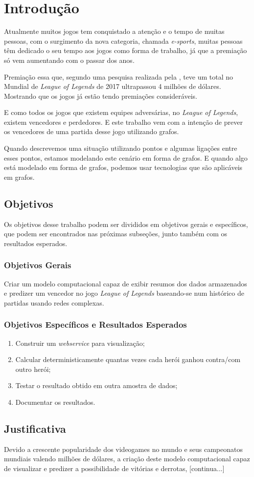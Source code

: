 \chapter{Introdução}
\label{chap:Introducao}

Atualmente muitos jogos tem conquistado a atenção e o tempo de muitas pessoas, com o surgimento da nova categoria, chamada \textit{e-sports}, muitas pessoas têm dedicado o seu tempo aos jogos como forma de trabalho, já que a premiação só vem aumentando com o passar dos anos.

Premiação essa que, segundo uma pesquisa realizada pela \citet{espn}, teve um total no Mundial de \textit{League of Legends} de 2017 ultrapassou 4 milhões de dólares. Mostrando que os jogos já estão tendo premiações consideráveis.

E como todos os jogos que existem equipes adversárias, no \textit{League of Legends}, existem vencedores e perdedores. E este trabalho vem com a intenção de prever os vencedores de uma partida desse jogo utilizando grafos.

Quando descrevemos uma situação utilizando pontos e algumas ligações entre esses pontos, estamos modelando este cenário em forma de grafos. E quando algo está modelado em forma de grafos, podemos usar tecnologias que são aplicáveis em grafos.

\section{Objetivos}
Os objetivos desse trabalho podem ser divididos em objetivos gerais e específicos, que podem ser encontrados nas próximas subseções, junto também com os resultados esperados.
\subsection{Objetivos Gerais}
Criar um modelo computacional capaz de exibir resumos dos dados armazenados  e predizer um vencedor no jogo \textit{League of Legends} baseando-se num histórico de partidas usando redes complexas.

\subsection{Objetivos Específicos e Resultados Esperados}

\begin{enumerate}
\item Construir um \textit{webservice} para visualização;
\item Calcular deterministicamente quantas vezes cada herói ganhou contra/com outro herói;
\item Testar o resultado obtido em outra amostra de dados;
\item Documentar os resultados.

\end{enumerate}

\section{Justificativa}
Devido a crescente popularidade dos videogames no mundo e seus campeonatos mundiais valendo milhões de dólares, a criação deste modelo computacional capaz de visualizar e predizer a possibilidade de vitórias e derrotas, [continua...]